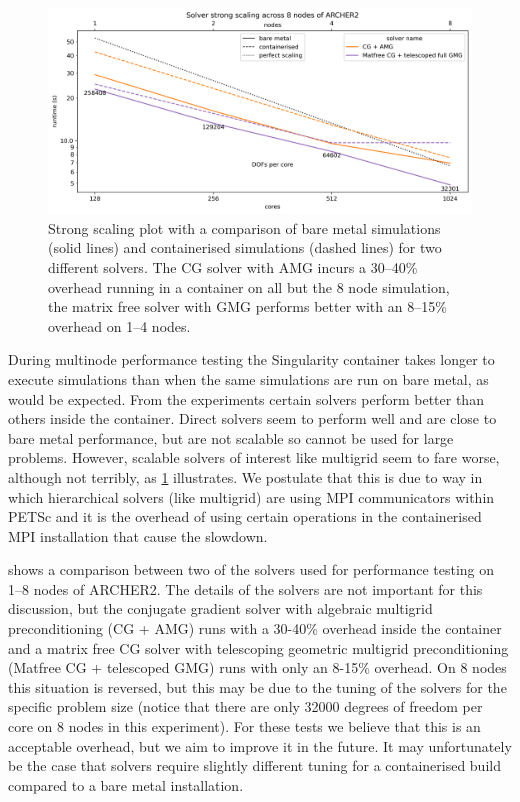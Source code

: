 \documentclass[a4paper,11pt]{article}
\begin{document}
\begin{figure}[htp]
	\centering
	\includegraphics[width=\textwidth]{strong.png}
	\vspace{-1em}
	\caption{Strong scaling plot with a comparison of bare metal simulations (solid lines) and containerised simulations (dashed lines) for two different solvers. The CG solver with AMG incurs a 30--40\% overhead running in a container on all but the 8 node simulation, the matrix free solver with GMG performs better with an 8--15\% overhead on 1--4 nodes.}
	\label{fig:sing_perf}
\end{figure}
During multinode performance testing the Singularity container takes longer to execute simulations than when the same simulations are run on bare metal, as would be expected.
From the experiments certain solvers perform better than others inside the container.
Direct solvers seem to perform well and are close to bare metal performance, but are not scalable so cannot be used for large problems.
However, scalable solvers of interest like multigrid seem to fare worse, although not terribly, as \cref{fig:sing_perf} illustrates.
We postulate that this is due to way in which hierarchical solvers (like multigrid) are using MPI communicators within PETSc and it is the overhead of using certain operations in the containerised MPI installation that cause the slowdown.

 shows a comparison between two of the solvers used for performance testing on 1--8 nodes of ARCHER2.
The details of the solvers are not important for this discussion, but the conjugate gradient solver with algebraic multigrid preconditioning (CG + AMG) runs with a 30-40\% overhead inside the container and a matrix free CG solver with telescoping geometric multigrid preconditioning (Matfree CG + telescoped GMG) runs with only an 8-15\% overhead.
On 8 nodes this situation is reversed, but this may be due to the tuning of the solvers for the specific problem size (notice that there are only 32000 degrees of freedom per core on 8 nodes in this experiment).
For these tests we believe that this is an acceptable overhead, but we aim to improve it in the future.
It may unfortunately be the case that solvers require slightly different tuning for a containerised build compared to a bare metal installation.
\end{document}

